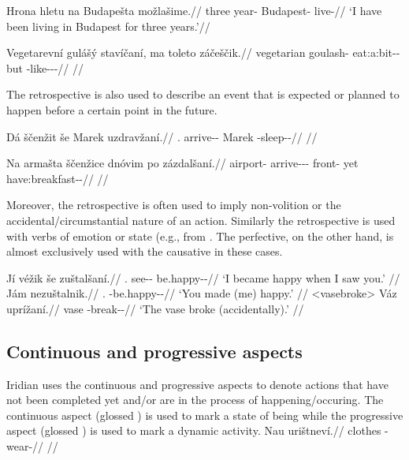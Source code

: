 \pex
\begingl
\gla Hrona hletu na Budapešta možlašime.//
\glb three year-\Ins{} \Loc{} Budapest-\Acc{} live-//
\glft `I have been living in Budapest for three years.'//
\endgl
\xe

\pex
\begingl
\gla Vegetarevní gulášý stavíčaní, ma toleto záčeščik.//
\glb vegetarian goulash-\Gen{} eat:a:bit-\Av{}-\Ret{} but \Aff{} \Neg{}-like-\Av{}-\Pf{}-\Quot{}//
\glft {} //
\endgl
\xe

The retrospective is also used to describe an event that is expected or planned
to happen before a certain point in the future.

\pex
\begingl
\gla Dá ščenžit še Marek uzdravžaní.//
\glb \First{}\Sg{}.\Str{} arrive-\Av{}-\SupP{} \Com{} Marek \Refl{}-sleep-\Av{}-\Ret{}//
\glft {} //
\endgl
\xe

\pex
\begingl
\gla Na armašta ščenžice dnóvim po zázdalšaní.//
\glb \Loc{} airport-\Acc{} arrive-\Av{}-\SupP{}-\Att{} front-\Ins{} yet have:breakfast-\Av{}-\Ret{}//
\glft {} //
\endgl
\xe

Moreover, the retrospective is often used to imply non-volition or the
accidental/circumstantial nature of an action. Similarly the retrospective is
used with verbs of emotion or state (e.g.,  from
. The perfective, on the other hand, is almost exclusively
used with the causative in these cases.

\pex
\a	\begingl
\gla Jí véžik še zuštalšaní.//
\glb \Second{}\Sg{}.\Acc{} see-\Av{}-\Pf{} \Com{} be.happy-\Av{}-\Ret{}//
\glft `I became happy when I saw you.' //
\endgl
\a	\begingl
\gla Jám nezuštalnik.//
\glb \Second{}\Sg{}.\Agt{} \Caus{}-be.happy-\Pv{}-\Pf{}//
\glft `You made (me) happy.' //
\endgl
\xe
\pex<vasebroke>
\begingl
\gla Váz uprížaní.//
\glb vase \Refl{}-break-\Av{}-\Pf{}//
\glft `The vase broke (accidentally).' //
\endgl
\xe

\subsection{Continuous and progressive aspects}
Iridian uses the continuous and progressive aspects to denote actions that have
not been completed yet and/or are in the process of happening/occuring. The
continuous aspect (glossed \Cont{}) is used to mark a state of being while the
progressive aspect (glossed \Prog{}) is used to mark a dynamic activity.
\pex
\begingl
\gla Nau urištneví.//
\glb clothes \Refl{}-wear-//
\glft {} //
\endgl
\xe

